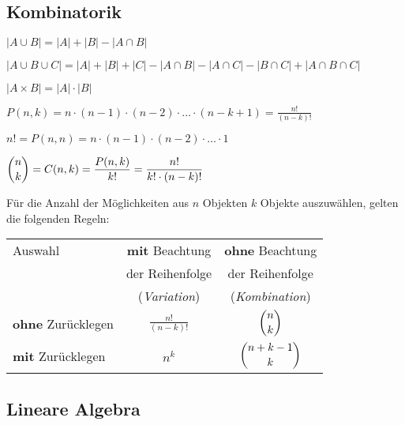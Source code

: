 \documentclass[
  ngerman,
  a4paper,
  landscape, fontsize=9pt, version=first, enabledeprecatedfontcommands,
  DIV=6]{scrartcl}
\providecommand{\tightlist}{%
  \setlength{\itemsep}{0pt}\setlength{\parskip}{0pt}}
\begin{document}
\begin{multicols}{3}
\hypertarget{kombinatorik}{%
\subsection{Kombinatorik}\label{kombinatorik}}

\begin{description}
\tightlist
\item[Summenregel]
\(\displaystyle |A \cup B| = |A| + |B| - |A \cap B|\)
\item[Inklusion und Exklusion]
\(\displaystyle |A \cup B \cup C| = |A| + |B| + |C| - |A \cap B| - |A \cap C| - |B \cap C| + |A \cap B \cap C|\)
\item[Produktregel]
\(\displaystyle |A \times B| = |A| \cdot |B|\)
\item[\(k\)-Permutationen / Variation]
\(\displaystyle P(n, k) = n \cdot (n-1) \cdot (n-2) \cdot \dotsc \cdot (n-k+1) = \frac{n!}{(n-k)!}\)
\item[Permutation]
\(\displaystyle n! = P(n, n) = n \cdot (n-1) \cdot (n-2) \cdot \dotsc \cdot 1\)
\item[Binomialkoeffizient]
\(\displaystyle \dbinom{n}{k} = C(n,k) = \frac{P(n,k)}{k!} = \frac{n!}{k! \cdot (n-k)!}\)
\end{description}

Für die Anzahl der Möglichkeiten aus \(n\) Objekten \(k\) Objekte
auszuwählen, gelten die folgenden Regeln:

\begin{center}
    \begin{tabular}{lcc}
        \toprule
        Auswahl & \textbf{mit} Beachtung    & \textbf{ohne} Beachtung   \\
        ~       & der Reihenfolge           & der Reihenfolge           \\
        ~       & (\textit{Variation})      & (\textit{Kombination})    \\
        \midrule
        \textbf{ohne} Zurücklegen & $\displaystyle\frac{n!}{(n-k)!}$    & $\displaystyle\dbinom{n}{k}$ \\
        \midrule
        \textbf{mit}  Zurücklegen & $\displaystyle n^k$             & $\dbinom{n+k-1}{k}$ \\
        \bottomrule
    \end{tabular}
\end{center}

\hypertarget{lineare-algebra}{%
\subsection{Lineare Algebra}\label{lineare-algebra}}


\end{multicols}
\end{document}
